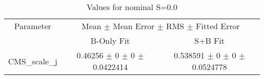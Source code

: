 \begin{table}
\centering
\caption{Values for nominal S=0.0}
\begin{tabular}{ccc}
\toprule
Parameter & \multicolumn{2}{c}{Mean $\pm$ Mean Error $\pm$ RMS $\pm$ Fitted Error}\\
 & B-Only Fit & S+B Fit\\
\midrule
CMS\_scale\_j & \num{0.46256} $\pm$ \num{0} $\pm$ \num{0} $\pm$ \num{0.0422414} & \num{0.538591} $\pm$ \num{0} $\pm$ \num{0} $\pm$ \num{0.0524778}\\
\bottomrule
\end{tabular}
\end{table}